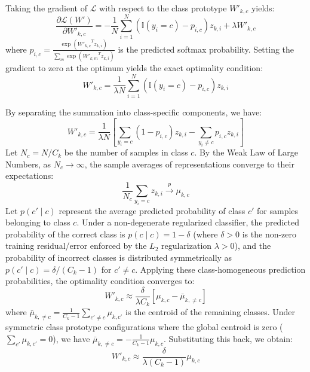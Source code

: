 Taking the gradient of $\mathcal{L}$ with respect to the class prototype $W'_{k, c}$ yields:
\begin{equation}
\frac{\partial \mathcal{L}(W')}{\partial W'_{k, c}} = -\frac{1}{N} \sum_{i=1}^N \left( \mathbb{I}(y_i = c) - p_{i, c} \right) z_{k, i} + \lambda W'_{k, c}
\end{equation}
where $p_{i, c} = \frac{\exp({W'_{k, c}}^T z_{k, i})}{\sum_{m} \exp({W'_{k, m}}^T z_{k, i})}$ is the predicted softmax probability. Setting the gradient to zero at the optimum yields the exact optimality condition:
\begin{equation}
W'_{k, c} = \frac{1}{\lambda N} \sum_{i=1}^N \left( \mathbb{I}(y_i = c) - p_{i, c} \right) z_{k, i}
\end{equation}

By separating the summation into class-specific components, we have:
\begin{equation}
W'_{k, c} = \frac{1}{\lambda N} \left[ \sum_{y_i = c} (1 - p_{i, c}) z_{k, i} - \sum_{y_i \ne c} p_{i, c} z_{k, i} \right]
\end{equation}
Let $N_c = N / C_k$ be the number of samples in class $c$. By the Weak Law of Large Numbers, as $N_c \to \infty$, the sample averages of representations converge to their expectations:
\begin{equation}
\frac{1}{N_c}\sum_{y_i = c} z_{k, i} \xrightarrow{p} \mu_{k, c}
\end{equation}
Let $p(c' \mid c)$ represent the average predicted probability of class $c'$ for samples belonging to class $c$. Under a non-degenerate regularized classifier, the predicted probability of the correct class is $p(c \mid c) = 1 - \delta$ (where $\delta > 0$ is the non-zero training residual/error enforced by the $L_2$ regularization $\lambda > 0$), and the probability of incorrect classes is distributed symmetrically as $p(c' \mid c) = \delta / (C_k - 1)$ for $c' \ne c$. Applying these class-homogeneous prediction probabilities, the optimality condition converges to:
\begin{equation}
W'_{k, c} \approx \frac{\delta}{\lambda C_k} \left[ \mu_{k, c} - \bar{\mu}_{k, \ne c} \right]
\end{equation}
where $\bar{\mu}_{k, \ne c} = \frac{1}{C_k - 1}\sum_{c' \ne c} \mu_{k, c'}$ is the centroid of the remaining classes. Under symmetric class prototype configurations where the global centroid is zero ($\sum_{c'} \mu_{k, c'} = 0$), we have $\bar{\mu}_{k, \ne c} = -\frac{1}{C_k - 1}\mu_{k, c}$. Substituting this back, we obtain:
\begin{equation}
W'_{k, c} \approx \frac{\delta}{\lambda (C_k - 1)} \mu_{k, c}
\end{equation}

